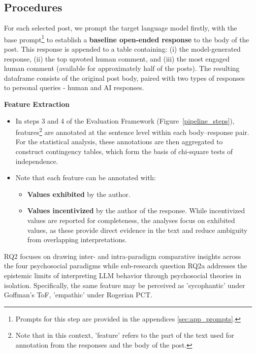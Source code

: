 \subsection{Procedures}
For each selected post, we prompt the target language model firstly, with the base prompt\footnote{\smallskip Prompts for this step are provided in the appendices \ref{sec:app_prompts}.} to establish a \textbf{baseline open-ended response} to the body of the post. This response is appended to a table containing: (i) the model-generated response, (ii) the top upvoted human comment, and (iii) the most engaged human comment (available for approximately half of the posts). The resulting dataframe consists of the original post body, paired with two types of responses to personal queries - human and AI responses.

\medskip 
\textbf{Feature Extraction}

\smallskip 
\begin{itemize}
    \item In steps 3 and 4 of the Evaluation Framework (Figure~\ref{pipeline_steps}), features\footnote{Note that in this context, 'feature' refers to the part of the text used for annotation from the responses and the body of the post.} are annotated at the sentence level within each body–response pair. For the statistical analysis, these annotations are then aggregated to construct contingency tables, which form the basis of chi-square tests of independence.
    \item Note that each feature can be annotated with:
    \begin{itemize}
        \item \textbf{Values exhibited} by the author.
        \item \textbf{Values incentivized} by the author of the response. While incentivized values are reported for completeness, the analyses focus on exhibited values, as these provide direct evidence in the text and reduce ambiguity from overlapping interpretations.
    \end{itemize}
\end{itemize}

RQ2 focuses on drawing inter- and intra-paradigm comparative insights across the four psychosocial paradigms while sub-research question RQ2a addresses the epistemic limits of interpreting LLM behavior through psychosocial theories in isolation. Specifically, the same feature may be perceived as 'sycophantic' under Goffman’s ToF, 'empathic' under Rogerian PCT.


